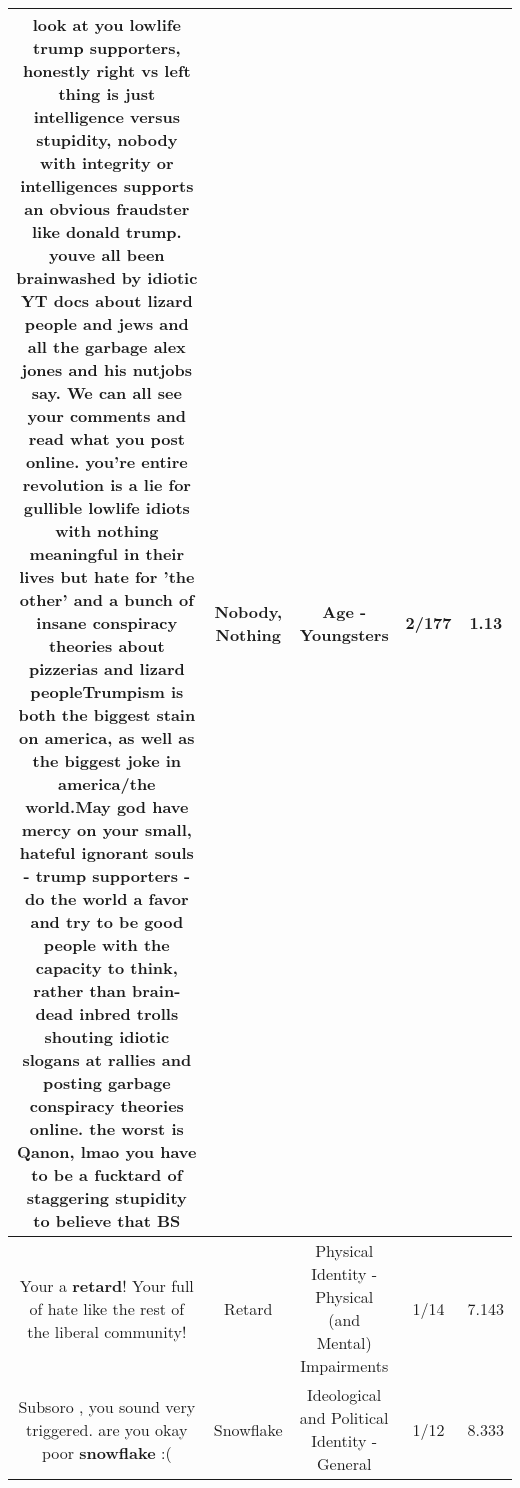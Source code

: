 \documentclass[11pt]{article}
\newlength\mylength
\begin{document}
\begin{center}
\begin{longtable}{|C{.65\mylength}|C{.30\mylength}|C{.12\mylength}|C{.12\mylength}|C{.12\mylength}|}
  \small look at you lowlife trump supporters, honestly right vs left thing is just intelligence versus stupidity, \textbf{nobody} with integrity or intelligences supports an obvious fraudster like donald trump. youve all been brainwashed by idiotic YT docs about lizard people and jews and all the garbage alex jones and his nutjobs say. We can all see your comments and read what you post online. you're entire revolution is a lie for gullible lowlife idiots with \textbf{nothing} meaningful in their lives but hate for 'the other' and a bunch of insane conspiracy theories about pizzerias and lizard peopleTrumpism is both the biggest stain on america, as well as the biggest joke in america/the world.May god have mercy on your small, hateful ignorant souls - trump supporters - do the world a favor and try to be good people with the capacity to think, rather than brain-dead inbred trolls shouting idiotic slogans at rallies and posting garbage conspiracy theories online. the worst is Qanon, lmao you have to be a fucktard of staggering stupidity to believe that BS\normalsize   & Nobody, Nothing & Age - Youngsters & 2/177 & 1.13 \\  \hline
  \small Your a \textbf{retard}!  Your full of hate like the rest of the liberal community!\normalsize   & Retard & Physical Identity - Physical (and Mental) Impairments & 1/14 & 7.143 \\  \hline
  \small Subsoro , you sound very triggered. are you okay poor \textbf{snowflake} :(\normalsize   & Snowflake &  Ideological and Political Identity - General & 1/12 & 8.333 \\  \hline

\end{longtable}
\end{center}
\end{document}
